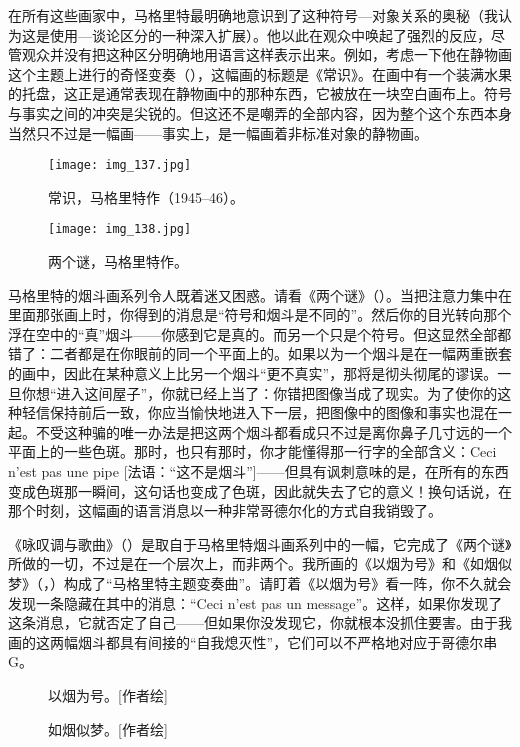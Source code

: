 在所有这些画家中，马格里特最明确地意识到了这种符号—对象关系的奥秘（我认为这是使用—谈论区分的一种深入扩展）。他以此在观众中唤起了强烈的反应，尽管观众并没有把这种区分明确地用语言这样表示出来。例如，考虑一下他在静物画这个主题上进行的奇怪变奏（），这幅画的标题是《常识》。在画中有一个装满水果的托盘，这正是通常表现在静物画中的那种东西，它被放在一块空白画布上。符号与事实之间的冲突是尖锐的。但这还不是嘲弄的全部内容，因为整个这个东西本身当然只不过是一幅画——事实上，是一幅画着非标准对象的静物画。

\begin{figure}
\texttt{[image: img\_137.jpg]}
\caption[常识，马格里特作。]
  {常识，马格里特作（1945--46）。}
\end{figure}

\begin{figure}
\texttt{[image: img\_138.jpg]}
\caption[两个谜，马格里特作。]
  {两个谜，马格里特作。}
\end{figure}

马格里特的烟斗画系列令人既着迷又困惑。请看《两个谜》（）。当把注意力集中在里面那张画上时，你得到的消息是“符号和烟斗是不同的”。然后你的目光转向那个浮在空中的“真”烟斗——你感到它是真的。而另一个只是个符号。但这显然全部都错了：二者都是在你眼前的同一个平面上的。如果以为一个烟斗是在一幅两重嵌套的画中，因此在某种意义上比另一个烟斗“更不真实”，那将是彻头彻尾的谬误。一旦你想“进入这间屋子”，你就已经上当了：你错把图像当成了现实。为了使你的这种轻信保持前后一致，你应当愉快地进入下一层，把图像中的图像和事实也混在一起。不受这种骗的唯一办法是把这两个烟斗都看成只不过是离你鼻子几寸远的一个平面上的一些色斑。那时，也只有那时，你才能懂得那一行字的全部含义：Ceci n'est pas une pipe [法语：“这不是烟斗”]——但具有讽刺意味的是，在所有的东西变成色斑那一瞬间，这句话也变成了色斑，因此就失去了它的意义！换句话说，在那个时刻，这幅画的语言消息以一种非常哥德尔化的方式自我销毁了。

《咏叹调与歌曲》（）是取自于马格里特烟斗画系列中的一幅，它完成了《两个谜》所做的一切，不过是在一个层次上，而非两个。我所画的《以烟为号》和《如烟似梦》（，）构成了“马格里特主题变奏曲”。请盯着《以烟为号》看一阵，你不久就会发现一条隐藏在其中的消息：“Ceci n'est pas un message”\lnote{[法文：“这不是消息”]}。这样，如果你发现了这条消息，它就否定了自己——但如果你没发现它，你就根本没抓住要害。由于我画的这两幅烟斗都具有间接的“自我熄灭性”，它们可以不严格地对应于哥德尔串G。

\begin{sidewaysfigure}
\begin{floatrow}
          {\caption[以烟为号。]{以烟为号。[作者绘]}}
          {\caption[如烟似梦。]{如烟似梦。[作者绘]}}
\end{floatrow}
\end{sidewaysfigure}

